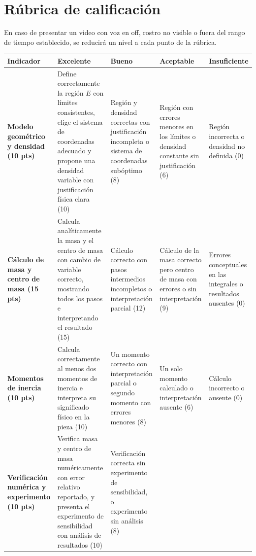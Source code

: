 \documentclass[a4,11pt]{aleph-notas}
\begin{document}
\section{Rúbrica de calificación}

En caso de presentar un video con voz en off, rostro no visible o fuera del rango de tiempo establecido, se reducirá un nivel a cada punto de la rúbrica.

\begin{landscape}
\begin{center}\footnotesize
\begin{tabular}{p{5cm}p{4cm}p{4cm}p{4cm}p{4cm}}
\toprule
\textbf{Indicador} & \textbf{Excelente} & \textbf{Bueno} & \textbf{Aceptable} & \textbf{Insuficiente} \\ \midrule
\textbf{Modelo geométrico y densidad (10 pts)}
    & Define correctamente la región $E$ con límites consistentes, elige el sistema de coordenadas adecuado y propone una densidad variable con justificación física clara (10)
    & Región y densidad correctas con justificación incompleta o sistema de coordenadas subóptimo (8)
    & Región con errores menores en los límites o densidad constante sin justificación (6)
    & Región incorrecta o densidad no definida (0) \\ \midrule
\textbf{Cálculo de masa y centro de masa (15 pts)}
    & Calcula analíticamente la masa y el centro de masa con cambio de variable correcto, mostrando todos los pasos e interpretando el resultado (15)
    & Cálculo correcto con pasos intermedios incompletos o interpretación parcial (12)
    & Cálculo de la masa correcto pero centro de masa con errores o sin interpretación (9)
    & Errores conceptuales en las integrales o resultados ausentes (0) \\ \midrule
\textbf{Momentos de inercia (10 pts)}
    & Calcula correctamente al menos dos momentos de inercia e interpreta su significado físico en la pieza (10)
    & Un momento correcto con interpretación parcial o segundo momento con errores menores (8)
    & Un solo momento calculado o interpretación ausente (6)
    & Cálculo incorrecto o ausente (0) \\ \midrule
\textbf{Verificación numérica y experimento (10 pts)}
    & Verifica masa y centro de masa numéricamente con error relativo reportado, y presenta el experimento de sensibilidad con análisis de resultados (10)
    & Verificación correcta sin experimento de sensibilidad, o experimento sin análisis (8)

\end{tabular}
\end{center}
\end{landscape}
\end{document}
